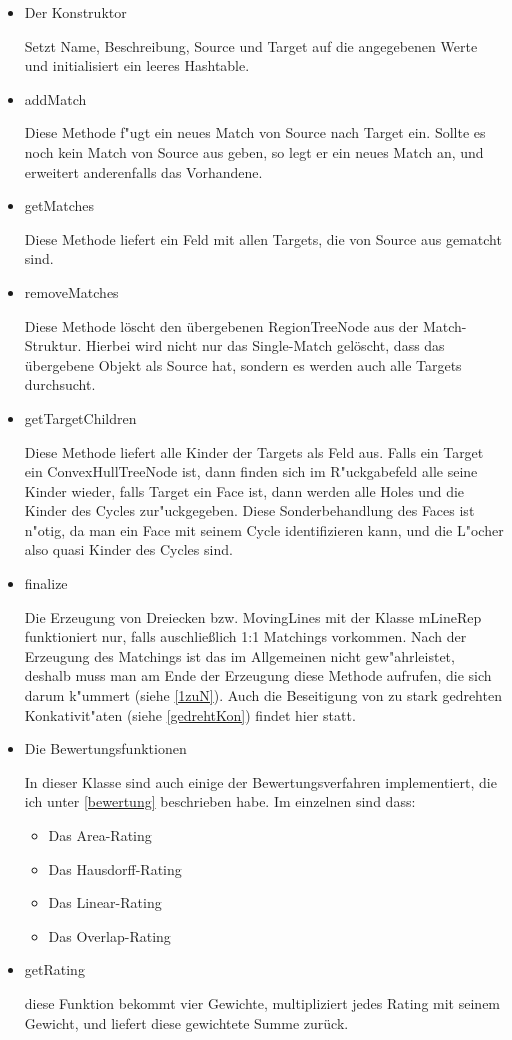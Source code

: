 \begin{itemize}

\item Der Konstruktor

Setzt Name, Beschreibung, Source und Target auf die angegebenen Werte und initialisiert ein leeres Hashtable.

\item addMatch

Diese Methode f"ugt ein neues Match von Source nach Target ein. Sollte es noch kein Match von Source aus geben, so legt er ein neues Match an, und erweitert anderenfalls das Vorhandene.

\item getMatches

Diese Methode liefert ein Feld mit allen Targets, die von Source aus gematcht sind.

\item removeMatches

Diese Methode löscht den übergebenen RegionTreeNode aus der Match-Struktur. Hierbei wird nicht nur das Single-Match gelöscht, dass das übergebene Objekt als Source hat, sondern es werden auch alle Targets durchsucht.

\item getTargetChildren

Diese Methode liefert alle Kinder der Targets als Feld aus. Falls ein Target ein ConvexHullTreeNode ist, dann finden sich im R"uckgabefeld alle seine Kinder  wieder, falls Target ein Face ist, dann werden alle Holes und die Kinder des Cycles zur"uckgegeben. Diese Sonderbehandlung des Faces ist n"otig, da man ein Face mit seinem Cycle identifizieren kann, und die L"ocher also quasi Kinder des Cycles sind.

\item finalize

Die Erzeugung von Dreiecken bzw. MovingLines mit der Klasse mLineRep funktioniert nur, falls auschließlich 1:1 Matchings vorkommen. Nach der Erzeugung des Matchings ist das im Allgemeinen nicht gew"ahrleistet, deshalb muss man am Ende der Erzeugung diese Methode aufrufen, die sich darum k"ummert (siehe \ref{1zuN}). Auch die Beseitigung von zu stark gedrehten Konkativit"aten (siehe \ref{gedrehtKon}) findet hier statt.

\item Die Bewertungsfunktionen

In dieser Klasse sind auch einige der Bewertungsverfahren implementiert, die ich unter \ref{bewertung} beschrieben habe. Im einzelnen sind dass:
\begin{itemize}
\item Das Area-Rating
\item Das Hausdorff-Rating
\item Das Linear-Rating
\item Das Overlap-Rating
\end{itemize}

\item getRating

diese Funktion bekommt vier Gewichte, multipliziert jedes Rating mit seinem Gewicht, und liefert diese gewichtete Summe zurück.

\end{itemize}


